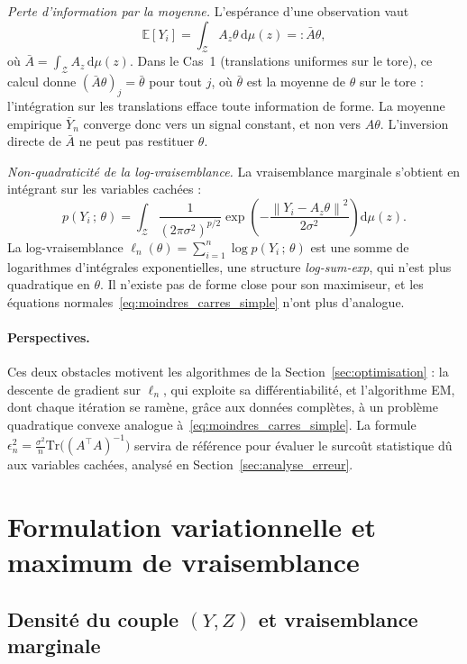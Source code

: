 \documentclass[12pt, a4paper]{article}
\theoremstyle{definition}
\newcommand{\E}{\mathbb{E}}
\newcommand{\Zcal}{\mathcal{Z}}
\newcommand{\norm}[1]{\left\|#1\right\|}
\newcommand{\Tr}{\mathrm{Tr}}
\begin{document}
\textit{Perte d'information par la moyenne.}
L'espérance d'une observation vaut
\[
    \E[Y_i] = \int_\Zcal A_z\theta\,\mathrm{d}\mu(z) =: \bar{A}\theta,
\]
où $\bar{A} = \int_\Zcal A_z\,\mathrm{d}\mu(z)$. Dans le Cas~1 (translations
uniformes sur le tore), ce calcul donne $(\bar{A}\theta)_j = \bar{\theta}$ pour
tout $j$, où $\bar{\theta}$ est la moyenne de $\theta$ sur le tore : l'intégration
sur les translations efface toute information de forme. La moyenne empirique
$\bar{Y}_n$ converge donc vers un signal constant, et non vers $A\theta$.
L'inversion directe de $\bar{A}$ ne peut pas restituer $\theta$.

\textit{Non-quadraticité de la log-vraisemblance.}
La vraisemblance marginale s'obtient en intégrant sur les variables cachées :
\[
    p(Y_i\,;\,\theta)
    = \int_\Zcal \frac{1}{(2\pi\sigma^2)^{p/2}}
      \exp\!\left(-\frac{\norm{Y_i - A_z\theta}^2}{2\sigma^2}\right)\mathrm{d}\mu(z).
\]
La log-vraisemblance $\ell_n(\theta) = \sum_{i=1}^n \log p(Y_i\,;\,\theta)$
est une somme de logarithmes d'intégrales exponentielles, une structure
\textit{log-sum-exp}, qui n'est plus quadratique en $\theta$. Il n'existe
pas de forme close pour son maximiseur, et les équations normales~\eqref{eq:moindres_carres_simple}
n'ont plus d'analogue.

\paragraph{Perspectives.}
Ces deux obstacles motivent les algorithmes de la Section~\ref{sec:optimisation} :
la descente de gradient sur $\ell_n$, qui exploite sa différentiabilité, et
l'algorithme EM, dont chaque itération se ramène, grâce aux données complètes,
à un problème quadratique convexe analogue à~\eqref{eq:moindres_carres_simple}.
La formule $\epsilon_n^2 = \frac{\sigma^2}{n}\Tr\bigl((A^\top A)^{-1}\bigr)$
servira de référence pour évaluer le surcoût statistique dû aux variables
cachées, analysé en Section~\ref{sec:analyse_erreur}.


% 
\newpage
\section{Formulation variationnelle et maximum de vraisemblance}
\label{sec:mle}

\subsection{Densité du couple \texorpdfstring{$(Y, Z)$}{(Y,Z)} et vraisemblance marginale}
\label{subsec:densite}
\end{document}
